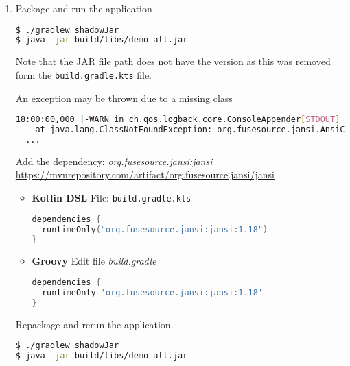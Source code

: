 \documentclass[12pt, letterpaper]{article}
\begin{document}
\begin{enumerate}
	\item Package and run the application

	      \begin{lstlisting}[language=bash]
$ ./gradlew shadowJar
$ java -jar build/libs/demo-all.jar
	      \end{lstlisting}

	      Note that the JAR file path does not have the version as this was removed form the \texttt{build.gradle.kts} file.

	      An exception may be thrown due to a missing class

	      \begin{lstlisting}[language=bash]
18:00:00,000 |-WARN in ch.qos.logback.core.ConsoleAppender[STDOUT] - Failed to create AnsiPrintStream. Falling back on the default stream. java.lang.ClassNotFoundException: org.fusesource.jansi.AnsiConsole
	at java.lang.ClassNotFoundException: org.fusesource.jansi.AnsiConsole
  ...
	      \end{lstlisting}

	      Add the dependency: \textit{org.fusesource.jansi:jansi}
	      \newline
	      {\footnotesize \url{https://mvnrepository.com/artifact/org.fusesource.jansi/jansi}}

	      \begin{itemize}

	      	\item[] \textbf{Kotlin DSL}
	      	      \newline
	      	      File: \texttt{build.gradle.kts}

	      	      \begin{lstlisting}[language=Kotlin]
dependencies {
  runtimeOnly("org.fusesource.jansi:jansi:1.18")
}
	      	      \end{lstlisting}

	      	\item[] \textbf{Groovy}
	      	      \newline
	      	      Edit file \textit{build.gradle}

	      	      \begin{lstlisting}[language=Groovy]
dependencies {
  runtimeOnly 'org.fusesource.jansi:jansi:1.18'
}
	      	      \end{lstlisting}

	      \end{itemize}

	      Repackage and rerun the application.

	      \begin{lstlisting}[language=bash]
$ ./gradlew shadowJar
$ java -jar build/libs/demo-all.jar
	      \end{lstlisting}

\end{enumerate}
\end{document}

